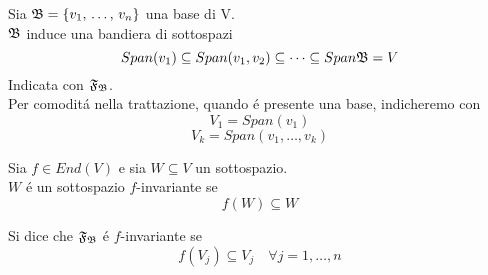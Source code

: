 \begin{defn} \bianco
Sia $\mathfrak{B}=\{ v_1, \, \dots , \, v_n \} $ una base di V.\\$\mathfrak{B}$ induce una bandiera di sottospazi
$$ Span(v_1) \subseteq Span(v_1, v_2) \subseteq \dots \subseteq Span \mathfrak{B} =V $$
Indicata con $\mathfrak{F}_{\mathfrak{B}}$.\\
Per comodit\'a nella trattazione, quando \'e presente una base, indicheremo con
$$ V_1 = Span(v_1)$$
$$ V_k=Span(v_1, \dots,  v_k) $$
\end{defn}
\spazio
\begin{defn}
Sia $f\in End(V)$ e sia $W \subseteq V $ un sottospazio.\\
$W$ \'e un sottospazio $f$-invariante se 
$$ f(W)\subseteq W $$
\end{defn}
\begin{defn}\bianco
Si dice che $\mathfrak{F}_{\mathfrak{B}}$ \'e $f$-invariante se 
$$ f(V_j) \subseteq V_j \quad \forall j =1, \dots, n$$
\end{defn}
\spazio
